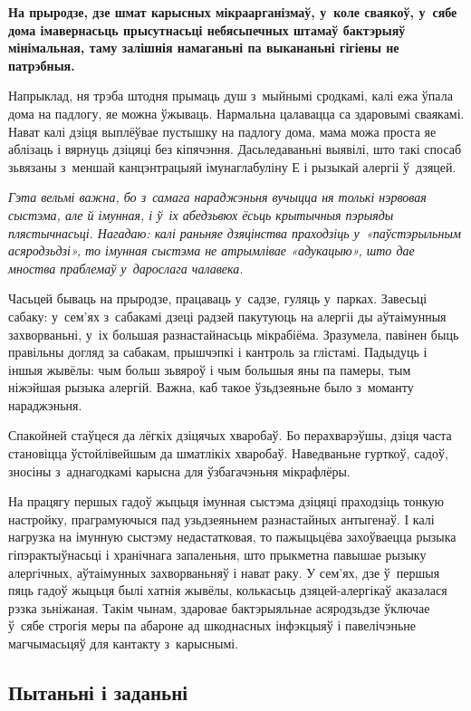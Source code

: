 \textbf{На прыродзе, дзе шмат карысных мікраарганізмаў, у~коле сваякоў, у~сябе дома імавернасьць прысутнасьці небясьпечных штамаў бактэрыяў мінімальная, таму залішнія намаганьні па выкананьні гігіены не патрэбныя.}

Напрыклад, ня трэба штодня прымаць душ з~мыйнымі сродкамі, калі ежа ўпала дома на падлогу, яе можна ўжываць. Нармальна цалавацца са здаровымі сваякамі. Нават калі дзіця выплёўвае пустышку на падлогу дома, мама можа проста яе аблізаць і вярнуць дзіцяці без кіпячэння. Дасьледаваньні выявілі, што такі спосаб зьвязаны з~меншай канцэнтрацыяй імунаглабуліну Е і рызыкай алергіі ў~дзяцей.

\emph{Гэта вельмі важна, бо з~самага нараджэньня вучыцца ня толькі нэрвовая сыстэма, але й імунная, і ў~іх абедзьвюх ёсьць крытычныя пэрыяды плястычнасьці. Нагадаю: калі раньняе дзяцінства праходзіць у~«паўстэрыльным асяродзьдзі», то імунная сыстэма не атрымлівае «адукацыю», што дае мноства праблемаў у~дарослага чалавека.}

Часьцей бываць на прыродзе, працаваць у~садзе, гуляць у~парках. Завесьці сабаку: у~сем'ях з~сабакамі дзеці радзей пакутуюць на алергіі ды аўтаімунныя захворваньні, у~іх большая разнастайнасьць мікрабіёма. Зразумела, павінен быць правільны догляд за сабакам, прышчэпкі і кантроль за глістамі. Падыдуць і іншыя жывёлы: чым больш зьвяроў і чым большыя яны па памеры, тым ніжэйшая рызыка алергій. Важна, каб такое ўзьдзеяньне было з~моманту нараджэньня. 

Спакойней стаўцеся да лёгкіх дзіцячых хваробаў. Бо перахварэўшы, дзіця часта становіцца ўстойлівейшым да шматлікіх хваробаў. Наведваньне гурткоў, садоў, зносіны з~аднагодкамі карысна для ўзбагачэньня мікрафлёры.

На працягу першых гадоў жыцьця імунная сыстэма дзіцяці праходзіць тонкую настройку, праграмуючыся пад узьдзеяньнем разнастайных антыгенаў. І калі нагрузка на імунную сыстэму недастатковая, то пажыцьцёва захоўваецца рызыка гіпэрактыўнасьці і хранічнага запаленьня, што прыкметна павышае рызыку алергічных, аўтаімунных захворваньняў і нават раку. У сем'ях, дзе ў~першыя пяць гадоў жыцьця былі хатнія жывёлы, колькасьць дзяцей-алергікаў аказалася рэзка зьніжаная. Такім чынам, здаровае бактэрыяльнае асяродзьдзе ўключае ў~сябе строгія меры па абароне ад шкоднасных інфэкцыяў і павелічэньне магчымасьцяў для кантакту з~карыснымі.

\subsection*{Пытаньні і заданьні}

